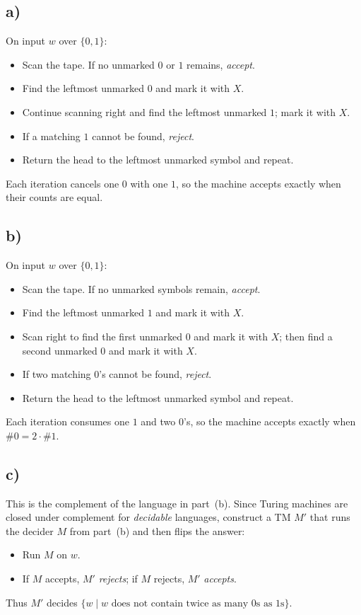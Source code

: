 \documentclass[a4paper, UTF-8]{article}
\theoremstyle{plain}
\begin{document}
\subsection{a)}

On input $w$ over $\{0,1\}$:
\begin{itemize}
    \item Scan the tape. If no unmarked $0$ or $1$ remains, \emph{accept}.
    \item Find the leftmost unmarked $0$ and mark it with $X$.
    \item Continue scanning right and find the leftmost unmarked $1$; mark it with $X$.
    \item If a matching $1$ cannot be found, \emph{reject}.
    \item Return the head to the leftmost unmarked symbol and repeat.
\end{itemize}
Each iteration cancels one $0$ with one $1$, so the machine accepts exactly when their counts are equal.

\subsection{b)}

On input $w$ over $\{0,1\}$:
\begin{itemize}
    \item Scan the tape. If no unmarked symbols remain, \emph{accept}.
    \item Find the leftmost unmarked $1$ and mark it with $X$.
    \item Scan right to find the first unmarked $0$ and mark it with $X$; then find a second unmarked $0$ and mark it with $X$.
    \item If two matching $0$'s cannot be found, \emph{reject}.
    \item Return the head to the leftmost unmarked symbol and repeat.
\end{itemize}
Each iteration consumes one $1$ and two $0$'s, so the machine accepts exactly when $\#0 = 2\cdot\#1$.

\subsection{c)}

This is the complement of the language in part~(b). Since Turing machines are closed under complement for \emph{decidable} languages, construct a TM $M'$ that runs the decider $M$ from part~(b) and then flips the answer:
\begin{itemize}
    \item Run $M$ on $w$.
    \item If $M$ accepts, $M'$ \emph{rejects}; if $M$ rejects, $M'$ \emph{accepts}.
\end{itemize}
Thus $M'$ decides $\{w \mid w \text{ does not contain twice as many 0s as 1s}\}$. 
\end{document}
